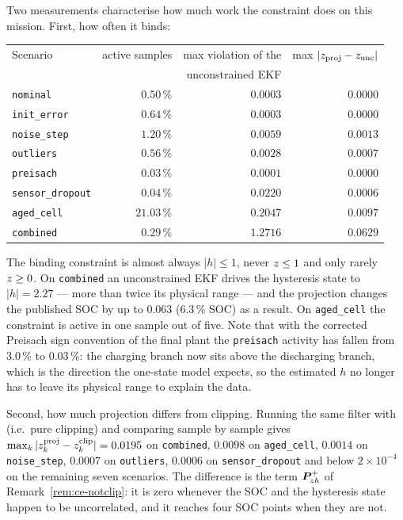 Two measurements characterise how much work the constraint does on this mission.  First, how often
it binds:
\begin{center}\small
\begin{tabular}{@{}lrrr@{}}
\toprule
Scenario & active samples & max violation of the & max $|z_{\mathrm{proj}}-z_{\mathrm{unc}}|$\\
         &                & unconstrained EKF     & \\
\midrule
\texttt{nominal}         & $0.50\,\%$  & $0.0003$ & $0.0000$\\
\texttt{init\_error}     & $0.64\,\%$  & $0.0003$ & $0.0000$\\
\texttt{noise\_step}     & $1.20\,\%$  & $0.0059$ & $0.0013$\\
\texttt{outliers}        & $0.56\,\%$  & $0.0028$ & $0.0007$\\
\texttt{preisach}        & $0.03\,\%$  & $0.0001$ & $0.0000$\\
\texttt{sensor\_dropout} & $0.04\,\%$  & $0.0220$ & $0.0006$\\
\texttt{aged\_cell}      & $21.03\,\%$ & $0.2047$ & $0.0097$\\
\texttt{combined}        & $0.29\,\%$  & $\mathbf{1.2716}$ & $\mathbf{0.0629}$\\
\bottomrule
\end{tabular}
\end{center}
The binding constraint is almost always $|h|\le1$, never $z\le1$ and only rarely $z\ge0$.
On \texttt{combined} an unconstrained EKF drives the hysteresis state to $|h|=2.27$ --- more than
twice its physical range --- and the projection changes the published SOC by up to $0.063$
(6.3\,\% SOC) as a result.  On \texttt{aged\_cell} the constraint is active in one sample out of
five.  Note that with the corrected Preisach sign convention of the final plant the
\texttt{preisach} activity has fallen from $3.0\,\%$ to $0.03\,\%$: the charging branch now sits
above the discharging branch, which is the direction the one-state model expects, so the estimated
$h$ no longer has to leave its physical range to explain the data.

Second, how much projection differs from clipping.  Running the same filter with
 (i.e.\ pure clipping) and
comparing sample by sample gives
$\max_k|z^{\mathrm{proj}}_k-z^{\mathrm{clip}}_k| = 0.0195$ on \texttt{combined},
$0.0098$ on \texttt{aged\_cell}, $0.0014$ on \texttt{noise\_step}, $0.0007$ on \texttt{outliers},
$0.0006$ on \texttt{sensor\_dropout} and below $2\times10^{-4}$ on the remaining seven scenarios.
The difference is the
term $\bm{P}^{+}_{z h}$ of Remark~\ref{rem:ce-notclip}: it is zero whenever the SOC and the
hysteresis state happen to be uncorrelated, and it reaches four SOC points when they are not.

